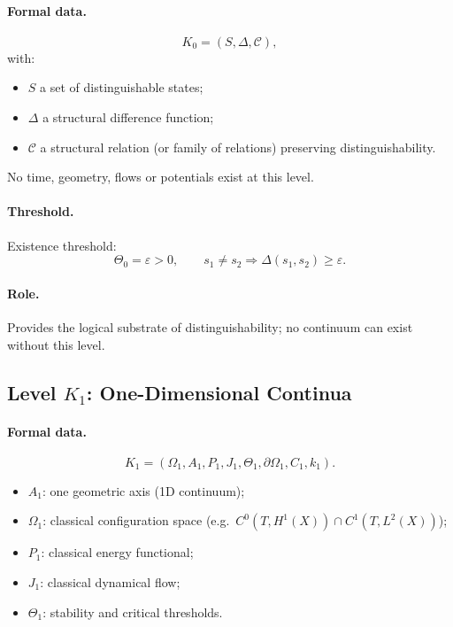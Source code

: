 \paragraph{Formal data.}
\[
    K_0 = (S,\Delta,\mathcal{C}),
\]
with:
\begin{itemize}
    \item \(S\) a set of distinguishable states;
    \item \(\Delta\) a structural difference function;
    \item \(\mathcal{C}\) a structural relation (or family of relations)
          preserving distinguishability.
\end{itemize}

No time, geometry, flows or potentials exist at this level.

\paragraph{Threshold.}
Existence threshold:
\[
   \Theta_0 = \varepsilon > 0,
   \qquad
   s_1 \neq s_2 \Rightarrow \Delta(s_1,s_2) \ge \varepsilon.
\]

\paragraph{Role.}
Provides the logical substrate of distinguishability;  
no continuum can exist without this level.


\subsection{Level \texorpdfstring{\texorpdfstring{$K_1$}{K\_1}}{K1}: One-Dimensional Continua}

\paragraph{Formal data.}
\[
    K_1 = (\Omega_1, A_1, P_1, J_1, \Theta_1,
           \partial\Omega_1, C_1, k_1).
\]

\begin{itemize}
    \item \(A_1\): one geometric axis (1D continuum);
    \item \(\Omega_1\): classical configuration space
          (e.g.\ \(C^0(T,H^1(X))\cap C^1(T,L^2(X))\));
    \item \(P_1\): classical energy functional;
    \item \(J_1\): classical dynamical flow;
    \item \(\Theta_1\): stability and critical thresholds.
\end{itemize}

